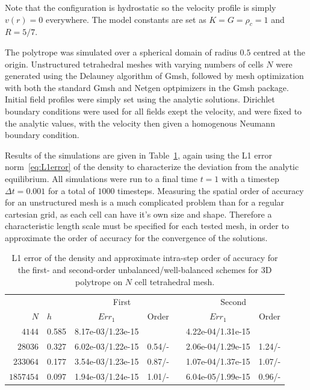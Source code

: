Note that the configuration is hydrostatic so the velocity profile is simply $v(r)=0$ everywhere. The model constants are set as $K=G=\rho_c=1$ and $R=5/7$.

The polytrope was simulated over a spherical domain of radius $0.5$ centred at the origin. Unstructured tetrahedral meshes with varying numbers of cells $N$ were generated using the Delauney algorithm of Gmsh, followed by mesh optimization with both the standard Gmsh and Netgen optpimizers in the Gmsh package.  Initial field profiles were simply set using the analytic solutions. Dirichlet boundary conditions were used for all fields exept the velocity, and were fixed to the analytic values, with the velocity then given a homogenous Neumann boundary condition.

Results of the simulations are given in Table~\ref{table:polytrope}, again using the L1 error norm~\eqref{eq:L1error} of the density to characterize the deviation from the analytic equilibrium. All simulations were run to a final time $t=1$ with a timestep $\Delta t=0.001$ for a total of $1000$ timesteps. Measuring the spatial order of accuracy for an unstructured mesh is a much complicated problem than for a regular cartesian grid, as each cell can have it's own size and shape. Therefore a characteristic length scale must be specified for each tested mesh, in order to approximate the order of accuracy for the convergence of the solutions.

\begin{table}\centering
\caption{L1 error of the density and approximate intra-step order of accuracy for the first- and second-order unbalanced/well-balanced schemes for 3D polytrope on $N$ cell tetrahedral mesh.}
\label{table:polytrope}
\begin{tabular}{@{}rlccccc@{}}\toprule
&& \multicolumn{2}{c}{First} &  & \multicolumn{2}{c}{Second}\\
\cmidrule{3-4} \cmidrule{6-7}
$N$ & \phantom{al}$h$ & $Err_1$ & Order && $Err_1$ & Order\\ \midrule
$4144$ & 0.585\phantom{a} & 8.17e-03/1.23e-15 &&& 4.22e-04/1.31e-15 &\\
$28036$ & 0.327 & 6.02e-03/1.22e-15 & 0.54/- && 2.06e-04/1.29e-15 & 1.24/-\\
$233064$ & 0.177 & 3.54e-03/1.23e-15 & 0.87/- && 1.07e-04/1.37e-15 & 1.07/-\\
$1857454$ & 0.097 & 1.94e-03/1.24e-15 & 1.01/- && 6.04e-05/1.99e-15 & 0.96/-\\
\bottomrule
\end{tabular}
\end{table}

